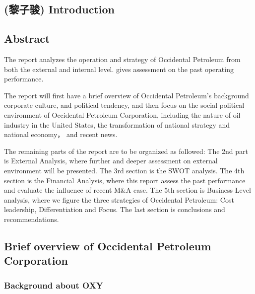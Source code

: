 \documentclass[
	a4paper, %
	12pt,%
]{CSSullivanBusinessReport}
\begin{document}
\begin{fullwidth}
    
\section{(黎子骏) Introduction} %

\subsection{Abstract}
The report analyzes the operation and strategy of Occidental Petroleum from both the external and internal level.
gives assessment on the past operating performance.
\par
The report will first have a brief overview of Occidental Petroleum's background corporate culture, and political tendency, and then focus on the social political environment of Occidental Petroleum Corporation, including the nature of oil industry in the United States, the transformation of national strategy and national economy， and recent news.
\par
The remaining parts of the report are to be organized as followed: The 2nd part is External Analysis, where further and deeper assessment on external environment will be presented.  
The 3rd section is the SWOT analysis. 
The 4th section is the Financial Analysis, where this report assess the past performance and evaluate the influence of recent M\&A case. 
The 5th section is Business Level analysis, where we figure the three strategies of Occidental Petroleum: Cost leadership, Differentiation and Focus.
The last section is conclusions and recommendations.

\subsection{Brief overview of Occidental Petroleum Corporation}
\subsubsection{Background about OXY}


\end{fullwidth}
\end{document}
